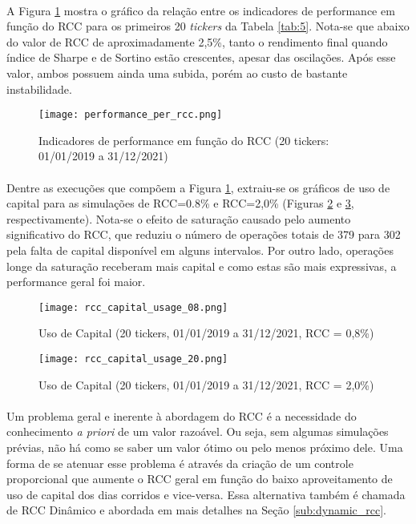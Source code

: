 \paragraph{} A Figura \ref{fig:550} mostra o gráfico da relação entre os indicadores de performance em função do RCC para os primeiros 20 \textit{tickers} da Tabela \ref{tab:5}. Nota-se que abaixo do valor de RCC de aproximadamente 2,5\%, tanto o rendimento final quando índice de Sharpe e de Sortino estão crescentes, apesar das oscilações. Após esse valor, ambos possuem ainda uma subida, porém ao custo de bastante instabilidade.

\begin{figure}[!htb]
    \texttt{[image: performance\_per\_rcc.png]}
    \centering
    \caption{Indicadores de performance em função do RCC (20 tickers: 01/01/2019 a 31/12/2021)}
    \label{fig:550}
\end{figure}

\paragraph{} Dentre as execuções que compõem a Figura \ref{fig:550}, extraiu-se os gráficos de uso de capital para as simulações de RCC=0.8\% e RCC=2,0\% (Figuras \ref{fig:551} e \ref{fig:552}, respectivamente). Nota-se o efeito de saturação causado pelo aumento significativo do RCC, que reduziu o número de operações totais de 379 para 302 pela falta de capital disponível em alguns intervalos. Por outro lado, operações longe da saturação receberam mais capital e como estas são mais expressivas, a performance geral foi maior.

\begin{figure}[!htb] %
    \texttt{[image: rcc\_capital\_usage\_08.png]}
    \centering
    \caption{Uso de Capital (20 tickers, 01/01/2019 a 31/12/2021, RCC = 0,8\%)}
    \label{fig:551}
\end{figure}

\begin{figure}[!htb] %
    \texttt{[image: rcc\_capital\_usage\_20.png]}
    \centering
    \caption{Uso de Capital (20 tickers, 01/01/2019 a 31/12/2021, RCC = 2,0\%)}
    \label{fig:552}
\end{figure}

\paragraph{} Um problema geral e inerente à abordagem do RCC é a necessidade do conhecimento \textit{a priori} de um valor razoável. Ou seja, sem algumas simulações prévias, não há como se saber um valor ótimo ou pelo menos próximo dele. Uma forma de se atenuar esse problema é através da criação de um controle proporcional que aumente o RCC geral em função do baixo aproveitamento de uso de capital dos dias corridos e vice-versa. Essa alternativa também é chamada de RCC Dinâmico e abordada em mais detalhes na Seção \ref{sub:dynamic_rcc}.

